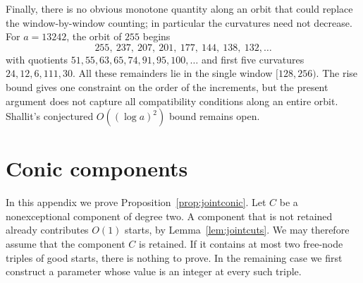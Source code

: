 \documentclass[11pt]{article}
\theoremstyle{definition}
\theoremstyle{remark}
\begin{document}
Finally, there is no obvious monotone quantity along an orbit that could
replace the window-by-window counting; in particular the curvatures need not
decrease. For $a=13242$, the orbit of
$255$ begins
\[
 255,\ 237,\ 207,\ 201,\ 177,\ 144,\ 138,\ 132,\ldots
\]
with quotients $51,55,63,65,74,91,95,100,\ldots$ and first five curvatures
$24,12,6,111,30$. All these remainders lie in the single window $[128,256)$.
The rise bound gives one constraint on the order of the increments, but
the present argument does not capture all compatibility conditions along
an entire orbit. Shallit's conjectured $O((\log a)^2)$ bound remains open.

\appendix

\section{Conic components}\label{app:conic}

In this appendix we prove Proposition~\ref{prop:jointconic}. Let $C$ be a nonexceptional
component of degree two. A component that is not retained
already contributes $O(1)$ starts, by Lemma~\ref{lem:jointcuts}. We may therefore assume that the component
$C$ is retained. If it contains at most two free-node triples of good starts,
there is nothing to prove. In the remaining case we first construct a
parameter whose value is an integer at every such triple.
\end{document}
